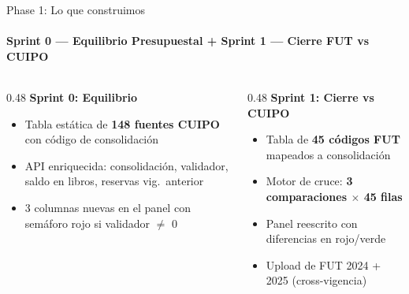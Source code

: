 \documentclass[aspectratio=169,12pt]{beamer}
\begin{document}
\begin{frame}{Phase 1: Lo que construimos}
\framesubtitle{Sprint 0 --- Equilibrio Presupuestal + Sprint 1 --- Cierre FUT vs CUIPO}

\begin{columns}[T]
\begin{column}{0.48\textwidth}
\textbf{\textcolor{ochre}{Sprint 0: Equilibrio}}
\begin{itemize}
    \item Tabla est\'atica de \textbf{148 fuentes CUIPO} con c\'odigo de consolidaci\'on
    \item API enriquecida: consolidaci\'on, validador, saldo en libros, reservas vig.~anterior
    \item 3 columnas nuevas en el panel con sem\'aforo rojo si validador $\neq$ 0
\end{itemize}
\end{column}

\begin{column}{0.48\textwidth}
\textbf{\textcolor{ochre}{Sprint 1: Cierre vs CUIPO}}
\begin{itemize}
    \item Tabla de \textbf{45 c\'odigos FUT} mapeados a consolidaci\'on
    \item Motor de cruce: \textbf{3 comparaciones $\times$ 45 filas}
    \item Panel reescrito con diferencias en rojo/verde
    \item Upload de FUT 2024 + 2025 (cross-vigencia)
\end{itemize}
\end{column}
\end{columns}

\vspace{6pt}
\begin{center}
\end{center}
\end{frame}
\end{document}
